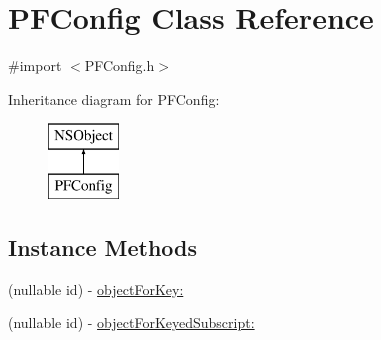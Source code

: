 \hypertarget{interface_p_f_config}{}\section{P\+F\+Config Class Reference}
\label{interface_p_f_config}


{\ttfamily \#import $<$P\+F\+Config.\+h$>$}

Inheritance diagram for P\+F\+Config\+:\begin{figure}[H]
\begin{center}
\leavevmode
\includegraphics[height=2.000000cm]{interface_p_f_config}
\end{center}
\end{figure}
\subsection*{Instance Methods}
\begin{DoxyCompactItemize}
\item 
(nullable id) -\/ \hyperlink{interface_p_f_config_af431f30589c00c2deb64890be7b9e85d}{object\+For\+Key\+:}
\begin{DoxyCompactList}\small\item\em 

 \end{DoxyCompactList}\item 
(nullable id) -\/ \hyperlink{interface_p_f_config_a88078668ce7f8b1d6ecb729f4d0e68f5}{object\+For\+Keyed\+Subscript\+:}
\end{DoxyCompactItemize}
